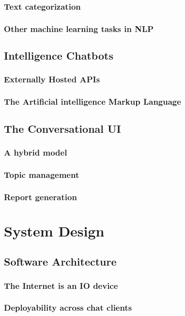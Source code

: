 \documentclass[12pt, twoside, a4paper, draft]{report}
\begin{document}
\subsection{Text categorization}
\subsection{Other machine learning tasks in NLP}
\section{Intelligence Chatbots}
\subsection{Externally Hosted APIs}
\subsection{The Artificial intelligence Markup Language}

\section{The Conversational UI}
\subsection{A hybrid model}

\subsection{Topic management}
\subsection{Report generation}

\chapter{System Design}
\section{Software Architecture}
\subsection{The Internet is an IO device}
\subsection{Deployability across chat clients}
\end{document}
